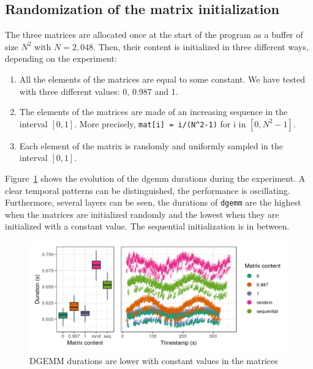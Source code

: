         \subsection{Randomization of the matrix initialization}
        \label{sub:randomization_matrix_initialization}
            The three matrices are allocated once at the start of the program as a buffer of size \(N^2\) with
            \(N=2,048\). Then, their content is initialized in three different ways, depending on the experiment:
            \begin{enumerate}
                \item All the elements of the matrices are equal to some constant. We have tested with three different
                    values: 0, 0.987 and 1.
                \item The elements of the matrices are made of an increasing sequence in the interval \([0, 1]\). More
                    precisely, \texttt{mat[i] = i/(N\textasciicircum{}2-1)} for i in \([0, N^2-1]\).
                \item Each element of the matrix is randomly and uniformly sampled in the interval \([0, 1]\).
            \end{enumerate}

        Figure~\ref{fig:exp:bit-flips:method-perf} shows the evolution of the dgemm durations during the experiment.
        A clear temporal patterns can be distinguished, the performance is oscillating.  Furthermore, several layers can
        be seen, the durations of \texttt{dgemm} are the highest when the matrices are initialized randomly and the
        lowest when they are initialized with a constant value. The sequential initialization is in between.

        \begin{figure}[htbp]
            \centering
            \includegraphics[width=\textwidth]{img/experiment/bit-flips/generation_method_perf.png}
            \caption{\label{fig:exp:bit-flips:method-perf}
            DGEMM durations are lower with constant values in the matrices}
        \end{figure}

